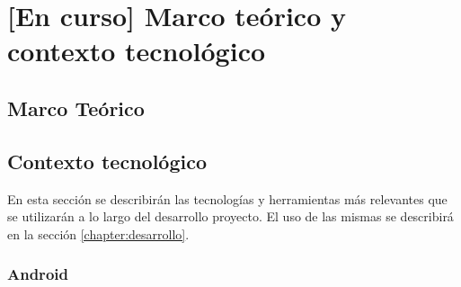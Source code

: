 \chapter{[En curso] Marco teórico y contexto tecnológico}
\label{chapter:marco}


\section{Marco Teórico}


%
%
%
%


\section{Contexto tecnológico}

    En esta sección se describirán las tecnologías y herramientas más relevantes que se utilizarán a lo
    largo del desarrollo proyecto. El uso de las mismas se describirá en la sección \ref{chapter:desarrollo}.
       
    \subsection{Android}

